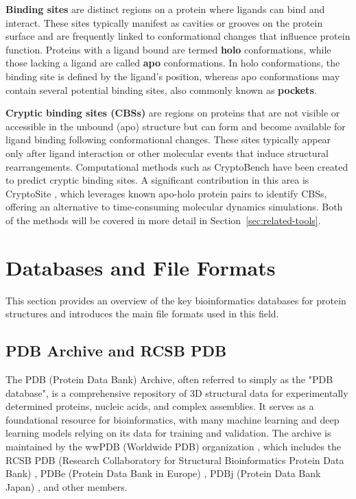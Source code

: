 \textbf{Binding sites} are distinct regions on a protein where ligands can bind and interact. These sites typically manifest as cavities or grooves on the protein surface and are frequently linked to conformational changes that influence protein function. Proteins with a ligand bound are termed \textbf{holo} conformations, while those lacking a ligand are called \textbf{apo} conformations. In holo conformations, the binding site is defined by the ligand’s position, whereas apo conformations may contain several potential binding sites, also commonly known as \textbf{pockets}.

\textbf{Cryptic binding sites (CBSs)} are regions on proteins that are not visible or accessible in the unbound (apo) structure but can form and become available for ligand binding following conformational changes. These sites typically appear only after ligand interaction or other molecular events that induce structural rearrangements. Computational methods such as CryptoBench \cite{vskrhak2025cryptobench} have been created to predict cryptic binding sites. A significant contribution in this area is CryptoSite \cite{cimermancic2016cryptosite}, which leverages known apo-holo protein pairs to identify CBSs, offering an alternative to time-consuming molecular dynamics simulations. Both of the methods will be covered in more detail in Section~\ref{sec:related-tools}.

\section{Databases and File Formats}
\label{sec:dbs-formats}

This section provides an overview of the key bioinformatics databases for protein structures and introduces the main file formats used in this field.

\subsection{PDB Archive and RCSB PDB}
\label{sec:rcsb-pdb}

The PDB (Protein Data Bank) Archive, often referred to simply as the "PDB database", is a comprehensive repository of 3D structural data for experimentally determined proteins, nucleic acids, and complex assemblies. It serves as a foundational resource for bioinformatics, with many machine learning and deep learning models relying on its data for training and validation. The archive is maintained by the wwPDB (Worldwide PDB) organization \cite{berman2003announcing}, which includes the RCSB PDB (Research Collaboratory for Structural Bioinformatics Protein Data Bank) \cite{berman2000protein}, PDBe (Protein Data Bank in Europe) \cite{velankar2010pdbe}, PDBj (Protein Data Bank Japan) \cite{kinjo2012protein}, and other members. 

